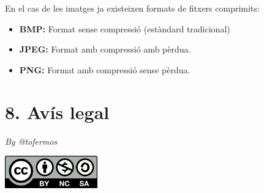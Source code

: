 \documentclass[
  12 pt,
  a4paper,
]{article}
\providecommand{\tightlist}{%
  \setlength{\itemsep}{0pt}\setlength{\parskip}{0pt}}
\begin{document}
En el cas de les imatges ja existeixen formats de fitxers comprimits:

\begin{itemize}
\tightlist
\item
  \textbf{BMP:} Format sense compressió (estàndard tradicional)
\item
  \textbf{JPEG:} Format amb compressió amb pèrdua.
\item
  \textbf{PNG:} Format amb compressió sense pèrdua.
\end{itemize}

\section{8. Avís legal}\label{avuxeds-legal}

\emph{By @tofermos}

\includegraphics[width=0.3\textwidth,height=\textheight]{../recursos/cc-by-nc-sa.png}
\end{document}
